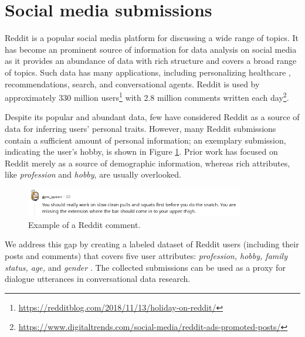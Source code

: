 
\section{Social media submissions}
\label{data_reddust}

Reddit is a popular social media platform for discussing a wide range of topics. It has become an prominent source of information for data analysis on social media as it provides an abundance of data with rich structure and covers a broad range of topics. Such data has many applications, including personalizing healthcare \cite{gyrard2018personalized}, recommendations, search, and conversational agents. 
Reddit is used by approximately 330 million users\footnote{{\scriptsize \url{https://redditblog.com/2018/11/13/holiday-on-reddit/}}}
with 2.8 million comments written each day\footnote{{\scriptsize \url{https://www.digitaltrends.com/social-media/reddit-ads-promoted-posts/}}}. 

Despite its popular and abundant data, few have considered Reddit as a source of data for inferring users' personal traits. However, many Reddit submissions contain a sufficient amount of personal information; an exemplary submission, indicating the user's hobby, is shown in Figure \ref{fig:input}. Prior work has focused on Reddit merely as a source of demographic information, whereas rich attributes, like \textit{profession} and \textit{hobby}, are usually overlooked. 

\begin{figure}[th!]
\centering
\includegraphics[width=0.85\textwidth]{data/pics/gym_queen.png}
\caption{
Example of a Reddit comment.
}
\label{fig:input}
\end{figure}

We address this gap by creating a labeled dataset of Reddit users %
(including their posts and comments) that covers five user attributes: \textit{profession, hobby, family status, age,} and \emph{gender} \cite{tigunova2020reddust}. The collected submissions can be used as a proxy for dialogue utterances in conversational data research.

